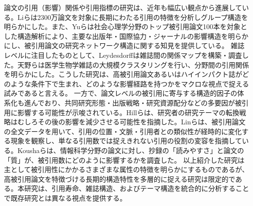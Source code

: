 論文の引用（影響）関係や引用指標の研究は、近年も幅広い観点から進展している。Liら\cite{Li1}は2300万論文を対象に長期にわたる引用の特徴を分析しグループ構造を明らかにした。また、Yuら\cite{Yu1}は社会心理学分野のトップ被引用論文100本を対象とした構造解析により、主要な出版年・国際協力・ジャーナルの影響構造を明らかにし、被引用論文の研究ネットワーク構造に関する知見を提供している。 雑誌レベルに注目したものとして、Leydesdorff\cite{Ley1,Ley2,Ley3,Ley4}は雑誌間の関係マップを構築・調査した。天野ら\cite{Ama1,Ama2}は医学生物学雑誌の大規模クラスタリングを行い、分野間の引用関係を明らかにした。こうした研究は、高被引用論文あるいはハイインパクト誌がどのような条件下で生まれ、どのような影響経路を持つかをマクロな視点で捉える試みであると言える。
一方で、論文レベルの被引用に寄与する構造的因子の体系化も進んでおり、共同研究形態・出版戦略・研究資源配分などの多要因が被引用に影響する可能性が示唆されている。Hillら\cite{Hil1}は、研究者の研究テーマの転換戦略はむしろその後の影響を減少させる可能性を指摘した。Linら\cite{Lin1}は、被引用論文の全文データを用いて、引用の位置・文脈・引用者との類似性が経時的に変化する現象を観察し、単なる引用数では捉えきれない引用の役割の変容を指摘している。Koushaら\cite{Ko1}は、情報科学分野の論文に対し、抄録の「読みやすさ」と論文の「質」が、被引用数にどのように影響するかを調査した。
以上紹介した研究は主として被引用性にかかるさまざまな属性の特徴を明らかにするものであるが、高被引用論文を特徴づける長期的構造特性を多層的に捉える研究は限定的である。本研究は、引用寿命、雑誌構造、およびテーマ構造を統合的に分析することで既存研究とは異なる視点を提供する。
